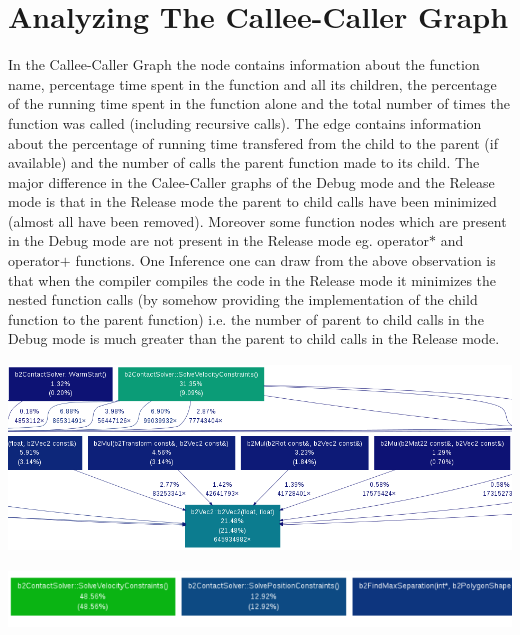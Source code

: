 \documentclass[11pt]{article}
\begin{document}
\section{Analyzing The Callee-Caller Graph}
	In the Callee-Caller Graph the node contains information about the function name, percentage time spent in the function and all its children, the percentage of the running time spent in the function alone and the total number of times the function was called (including recursive calls). The edge contains information about the percentage of running time transfered from the child to the parent (if available) and the number of calls the parent function made to its child.\newline
	The major difference in the Calee-Caller graphs of the Debug mode and the Release mode is that in the Release mode the parent to child calls have been minimized (almost all have been removed). Moreover some function nodes which are present in the Debug mode are not present in the Release mode eg. operator$*$ and operator$+$ functions.\newline
	One Inference one can draw from the above observation is that when the compiler compiles the code in the Release mode it minimizes the nested function calls (by somehow providing the implementation of the child function to the parent function) i.e. the number of parent to child calls in the Debug mode is much greater than the parent to child calls in the Release mode. 

	\begin{center}\includegraphics[height=5cm,width=20cm]{debug_1000_crop.png}\end{center}
	\begin{center}\includegraphics[height=1.5cm,width=15cm]{release_1000_crop.png}\end{center}
\end{document}
